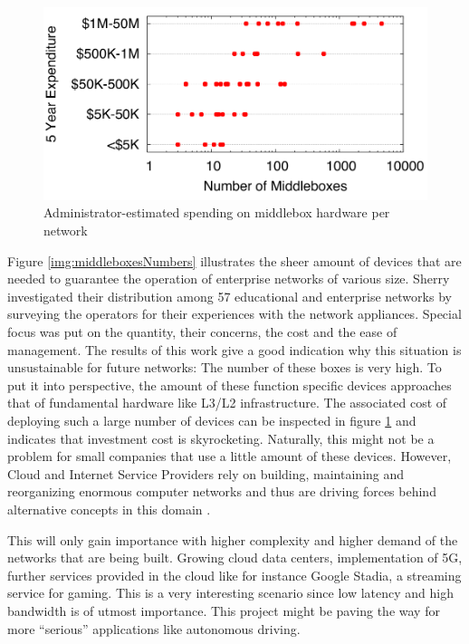 \begin{figure}[H]
	\centering
	\includegraphics[width=1\linewidth]{images/middleboxesCost.png}
	\caption{Administrator-estimated spending on middlebox hardware per network \cite{sherry2016middleboxes}}
	\label{img:middleboxesCost}
\end{figure}

Figure \ref{img:middleboxesNumbers} illustrates the sheer amount of devices that are needed to guarantee the operation of enterprise networks of various size. Sherry \cite{sherry2012survey} \cite{sherry2016middleboxes} investigated their distribution among 57 educational and enterprise networks by surveying the operators for their experiences with the network appliances. Special focus was put on the quantity, their concerns, the cost and the ease of management. The results of this work give a good indication why this situation is unsustainable for future networks:  The number of these boxes is very high. To put it into perspective, the amount of these function specific devices approaches that of fundamental hardware like L3/L2 infrastructure. The associated cost of deploying such a large number of devices can be inspected in figure \ref{img:middleboxesCost} and indicates that investment cost is skyrocketing. Naturally, this might not be a problem for small companies that use a little amount of these devices. However, Cloud and Internet Service Providers rely on building, maintaining and reorganizing enormous computer networks and thus are driving forces behind alternative concepts in this domain \cite{sherry2016middleboxes} \cite{sherry2012survey}.

This will only gain importance with higher complexity and higher demand of the networks that are being built. Growing cloud data centers, implementation of 5G, further services provided in the cloud like for instance Google Stadia, a streaming service for gaming. This is a very interesting scenario since low latency and high bandwidth is of utmost importance. This project might be paving the way for more ``serious'' applications like autonomous driving. 

